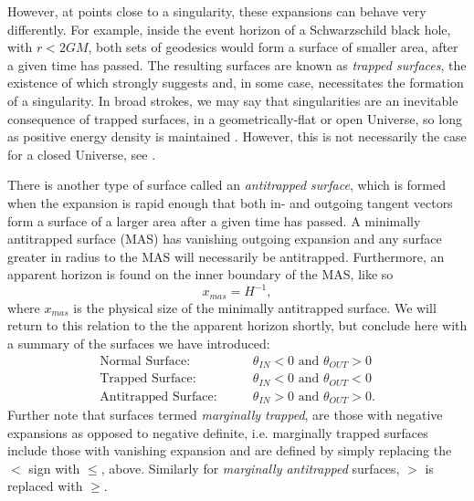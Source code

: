 However, at points close to a singularity, these expansions can behave very differently. For example, inside the event horizon of a Schwarzschild black hole, with $r<2GM$, both sets of geodesics would form a surface of smaller area, after a given time has passed. The resulting surfaces are known as \emph{trapped surfaces}, the existence of which strongly suggests and, in some case, necessitates the formation of a singularity. In broad strokes, we may say that singularities are an inevitable consequence of trapped surfaces, in a geometrically-flat or open Universe, so long as positive energy density is maintained \cite{tHooft:2009bh}. However, this is not necessarily the case for a closed Universe, see \cite{Ellis:2003mb}.

There is another type of surface called an \emph{antitrapped surface}, which is formed when the expansion is rapid enough that both in- and outgoing tangent vectors form a surface of a larger area after a given time has passed. A {minimally antitrapped surface} (MAS) has vanishing outgoing expansion and any surface greater in radius to the MAS will necessarily be antitrapped. Furthermore, an apparent horizon is found on the inner boundary of the MAS, like so
\[
\label{mashorizon}
x_{mas}=H^{-1}
,\]
where $x_{mas}$ is the physical size of the minimally antitrapped surface. We will return to this relation to the the apparent horizon shortly, but conclude here with a summary of the surfaces we have introduced:
\begin{align}
\mbox{Normal Surface:}&\qquad \theta_{IN}<0\mbox{ and } \theta_{OUT}>0
\\ \mbox{Trapped Surface:}&\qquad \theta_{IN}<0\mbox{ and } \theta_{OUT}<0
\\ \mbox{Antitrapped Surface:}&\qquad \theta_{IN}>0\mbox{ and } \theta_{OUT}>0.
\end{align}
Further note that surfaces termed \emph{marginally trapped}, are those with negative expansions as opposed to negative definite, i.e. marginally trapped surfaces include those with vanishing expansion and are defined by simply replacing the $<$ sign with $\leq$, above. Similarly for \emph{marginally antitrapped} surfaces, $>$ is replaced with $\geq$. 
